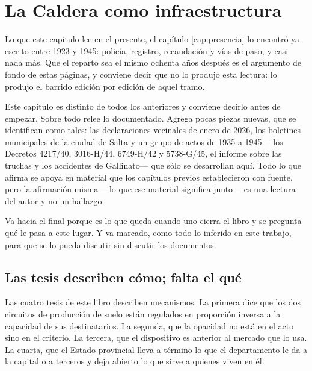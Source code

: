 \chapter{La Caldera como infraestructura}

\begin{cautela}
Lo que este capítulo lee en el presente, el capítulo \ref{cap:presencia} lo encontró ya escrito entre 1923 y 1945: policía, registro, recaudación y vías de paso, y casi nada más. Que el reparto sea el mismo ochenta años después es el argumento de fondo de estas páginas, y conviene decir que no lo produjo esta lectura: lo produjo el barrido edición por edición de aquel tramo.
\end{cautela}

\label{cap:infraestructura}
\begin{cautela}
Este capítulo es distinto de todos los anteriores y conviene decirlo antes de empezar. Sobre todo relee lo documentado. Agrega pocas piezas nuevas, que se identifican como tales: las declaraciones vecinales de enero de 2026, los boletines municipales de la ciudad de Salta y un grupo de actos de 1935 a 1945 ---los Decretos 4217/40, 3016-H/44, 6749-H/42 y 5738-G/45, el informe sobre las truchas y los accidentes de Gallinato--- que sólo se desarrollan aquí. Todo lo que afirma se apoya en material que los
capítulos previos establecieron con fuente, pero la afirmación misma —lo que ese material
significa junto— es una lectura del autor y no un hallazgo.

Va hacia el final porque es lo que queda cuando uno cierra el libro y se pregunta qué le pasa a
este lugar. Y va marcado, como todo lo inferido en este trabajo, para que se lo pueda
discutir sin discutir los documentos.
\end{cautela}

\section{Las tesis describen cómo; falta el qué}

Las cuatro tesis de este libro describen mecanismos. La primera dice que los dos circuitos de
producción de suelo están regulados en proporción inversa a la capacidad de sus
destinatarios. La segunda, que la opacidad no está en el acto sino en el criterio. La
tercera, que el dispositivo es anterior al mercado que lo usa. La cuarta, que el Estado provincial lleva a término lo que el departamento le da a la capital o a terceros y deja abierto lo que sirve a quienes viven en él.

